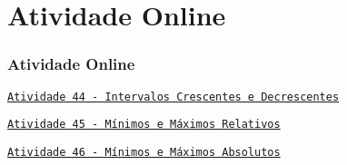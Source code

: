 \section{Atividade Online}
\begin{frame}
\frametitle{Atividade Online} 

\href{https://pt.khanacademy.org/math/algebra/algebra-functions/positive-negative-increasing-decreasing-intervals/e/increasing-decreasing-intervals-of-functions}
{{\tt Atividade 44 - Intervalos Crescentes e Decrescentes}}

\href{https://pt.khanacademy.org/math/algebra/algebra-functions/maximum-and-minimum-points/e/recognize-maxima-and-minima}
{{\tt Atividade 45 - Mínimos e Máximos Relativos}}

\href{https://pt.khanacademy.org/math/algebra/algebra-functions/maximum-and-minimum-points/e/recognize-absolute-maxima-and-minima}
{{\tt Atividade 46 - Mínimos e Máximos Absolutos}}


\end{frame}


